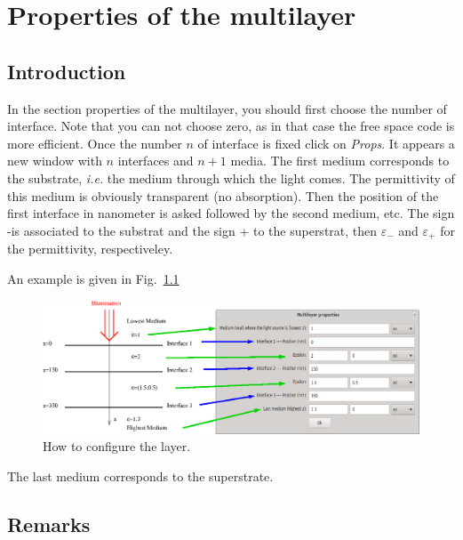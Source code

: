 \chapter{Properties of the multilayer }\label{chapl}

\minitoc

\section{Introduction}

In the section properties of the multilayer, you should first choose
the number of interface. Note that you can not choose zero, as in that
case the free space code is more efficient. Once the number $n$ of
interface is fixed click on {\it Props}. It appears a new window with
$n$ interfaces and $n+1$ media. The first medium corresponds to the
substrate, {\it i.e.} the medium through which the light comes. The
permittivity of this medium is obviously transparent (no absorption).
Then the position of the first interface in nanometer is asked
followed by the second medium, etc. The sign -is associated to the
substrat and the sign + to the superstrat, then $\varepsilon_{-}$ and
$\varepsilon_{+}$ for the permittivity, respectiveley.


An example is given in Fig.~\ref{configlayer}
\begin{figure}
\begin{center}
  \includegraphics*[width=15.0cm,draft=false]{configlayer.eps}
\end{center}
\caption{How to configure the layer.}
\label{configlayer}
\end{figure}


The last medium corresponds to the superstrate.


\section{Remarks}

